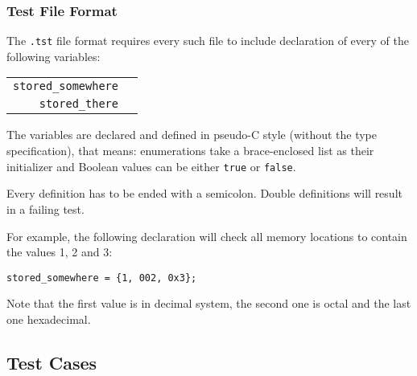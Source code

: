             \subsubsection{Test File Format}

            The \texttt{.tst} file format requires every such file to include declaration of every of the following variables:

            \begin{center}
            \begin{tabular}{ r | l }
                \texttt{stored\_somewhere} & \todo{...}\\

                \texttt{stored\_there} & \todo{...}\\

            \end{tabular}
            \end{center}

            The variables are declared and defined in pseudo-C style (without the type specification), that means: enumerations take a brace-enclosed list as their initializer and Boolean values can be either \texttt{true} or \texttt{false}.

            Every definition has to be ended with a semicolon. Double definitions will result in a failing test.

            For example, the following declaration will check all memory locations to contain the values 1, 2 and 3:

            \begin{center}
                \texttt{stored\_somewhere = \{1, 002, 0x3\};}
            \end{center}

            Note that the first value is in decimal system, the second one is octal and the last one hexadecimal.

        \subsection{Test Cases}


